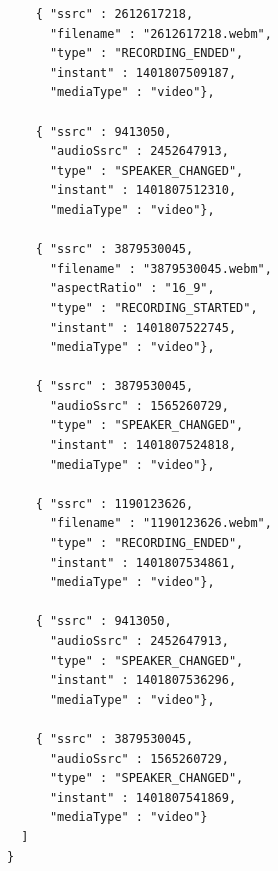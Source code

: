 \documentclass[twoside,openright,a4paper,12pt,english]{article}
\begin{document}
\begin{verbatim}
    { "ssrc" : 2612617218,
      "filename" : "2612617218.webm",
      "type" : "RECORDING_ENDED",
      "instant" : 1401807509187,
      "mediaType" : "video"},
      
    { "ssrc" : 9413050,
      "audioSsrc" : 2452647913,
      "type" : "SPEAKER_CHANGED",
      "instant" : 1401807512310,
      "mediaType" : "video"},
      
    { "ssrc" : 3879530045,
      "filename" : "3879530045.webm",
      "aspectRatio" : "16_9",
      "type" : "RECORDING_STARTED",
      "instant" : 1401807522745,
      "mediaType" : "video"},
      
    { "ssrc" : 3879530045,
      "audioSsrc" : 1565260729,
      "type" : "SPEAKER_CHANGED",
      "instant" : 1401807524818,
      "mediaType" : "video"},
      
    { "ssrc" : 1190123626,
      "filename" : "1190123626.webm",
      "type" : "RECORDING_ENDED",
      "instant" : 1401807534861,
      "mediaType" : "video"},
      
    { "ssrc" : 9413050,
      "audioSsrc" : 2452647913,
      "type" : "SPEAKER_CHANGED",
      "instant" : 1401807536296,
      "mediaType" : "video"},
      
    { "ssrc" : 3879530045,
      "audioSsrc" : 1565260729,
      "type" : "SPEAKER_CHANGED",
      "instant" : 1401807541869,
      "mediaType" : "video"}
  ]
}
\end{verbatim}




\clearpage


\end{document}
